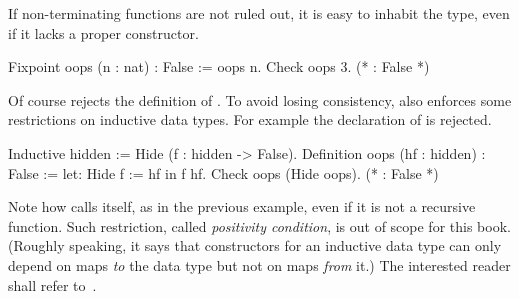 If non-terminating functions are not ruled out, it is easy to inhabit
the  type, even if it lacks a proper constructor.

\begin{coq}{}{}
Fixpoint oops (n : nat) : False := oops n.
Check oops 3.  (* : False *)
\end{coq}
Of course \Coq{} rejects the definition of .  To avoid
losing consistency, \Coq{} also enforces some restrictions on
inductive data types.  For example the declaration of 
is rejected.

\begin{coq}{}{}
Inductive hidden := Hide (f : hidden -> False).
Definition oops (hf : hidden) : False := let: Hide f := hf in f hf.
Check oops (Hide oops).  (* : False *)
\end{coq}
Note how  calls itself, as in the previous example,
even if it is not a recursive function.
Such restriction, called
\emph{positivity condition}, is out of scope for this book.
(Roughly speaking, it says that constructors for an inductive data
type can only depend on maps \emph{to} the data type but not on maps
\emph{from} it.)
The interested reader shall refer to~\cite{Coq:manual}.




